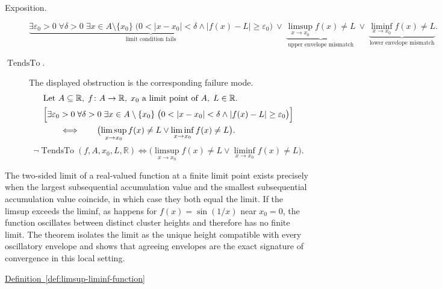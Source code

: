 \begin{remark*}
\begin{description}
  \item[Exposition.]
\[
\underbrace{\exists \varepsilon_0>0\;\forall \delta>0\;\exists x\in A\setminus\{x_0\}\;
\bigl(0<|x-x_0|<\delta\land |f(x)-L|\ge\varepsilon_0\bigr)}_{\text{limit condition fails}}
\ \lor\
\underbrace{\limsup_{x\to x_0} f(x)\ne L}_{\text{upper envelope mismatch}}
\ \lor\
\underbrace{\liminf_{x\to x_0} f(x)\ne L}_{\text{lower envelope mismatch}}.
\]


  \item[\(\operatorname{TendsTo}.\)]
  The displayed obstruction is the corresponding failure mode.
  \[
\begin{aligned}
&\text{Let } A \subseteq \mathbb{R},\; f \colon A \to \mathbb{R},\; x_0 \text{ a limit point of } A,\; L \in \mathbb{R}.\\
&\Bigl[\exists \varepsilon_0>0\;\forall \delta>0\;\exists x\in A\setminus\{x_0\}\;
\bigl(0<|x-x_0|<\delta\land |f(x)-L|\ge\varepsilon_0\bigr)\Bigr]\\
&\qquad\Longleftrightarrow\qquad
\bigl(\limsup_{x\to x_0} f(x)\ne L \lor \liminf_{x\to x_0} f(x)\ne L\bigr).
\end{aligned}
  \]
  \[
\neg\operatorname{TendsTo}(f,A,x_0,L,\mathbb{R})
\Longleftrightarrow
\bigl(\limsup_{x\to x_0} f(x)\ne L \lor \liminf_{x\to x_0} f(x)\ne L\bigr).
  \]
\end{description}
\end{remark*}

\begin{remark*}[Interpretation]
The two-sided limit of a real-valued function at a finite limit point exists precisely when the largest subsequential accumulation value and the smallest subsequential accumulation value coincide, in which case they both equal the limit. If the limsup exceeds the liminf, as happens for $f(x) = \sin(1/x)$ near $x_0 = 0$, the function oscillates between distinct cluster heights and therefore has no finite limit. The theorem isolates the limit as the unique height compatible with every oscillatory envelope and shows that agreeing envelopes are the exact signature of convergence in this local setting.
\end{remark*}

\begin{dependencies}
\hyperref[def:limsup-liminf-function]{Definition~\ref*{def:limsup-liminf-function}}
\end{dependencies}

